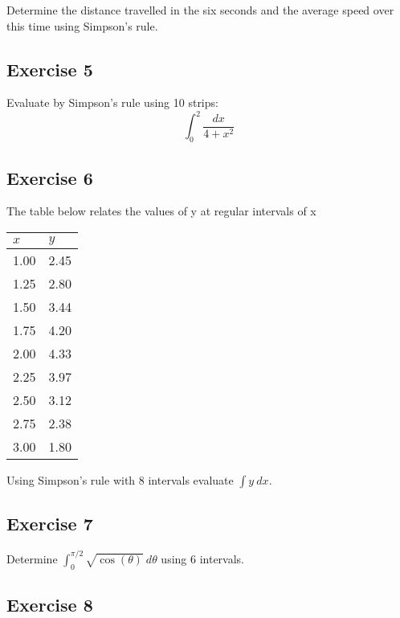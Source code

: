 \documentclass[
  english,
  11pt,
  oneside]{book}
\newcommand{\slide}{}
\theoremstyle{definition}
\theoremstyle{definition}
\theoremstyle{definition}
\theoremstyle{definition}
\theoremstyle{remark}
\begin{document}
Determine the distance travelled in the six seconds and the average speed over this time using
Simpson's rule.

\slide

\subsection*{Exercise 5}\label{exercise-5-3}

Evaluate by Simpson's rule using 10 strips:
\[
\int_0^2\frac{dx}{4+x^2}
\]

\slide

\subsection*{Exercise 6}\label{exercise-6-3}

The table below relates the values of y at regular intervals of x

\begin{tabular}{l|l}
\hline
$x$ & $y$\\
\hline
1.00 & 2.45\\
\hline
1.25 & 2.80\\
\hline
1.50 & 3.44\\
\hline
1.75 & 4.20\\
\hline
2.00 & 4.33\\
\hline
2.25 & 3.97\\
\hline
2.50 & 3.12\\
\hline
2.75 & 2.38\\
\hline
3.00 & 1.80\\
\hline
\end{tabular}

Using Simpson's rule with 8 intervals evaluate \(\displaystyle\int y\ dx\).

\slide

\subsection*{Exercise 7}\label{exercise-7-1}

Determine \(\displaystyle\int_0^{\pi/2}\sqrt{\cos(\theta)}\ d\theta\) using 6 intervals.

\slide

\subsection*{Exercise 8}\label{exercise-8}
\end{document}
